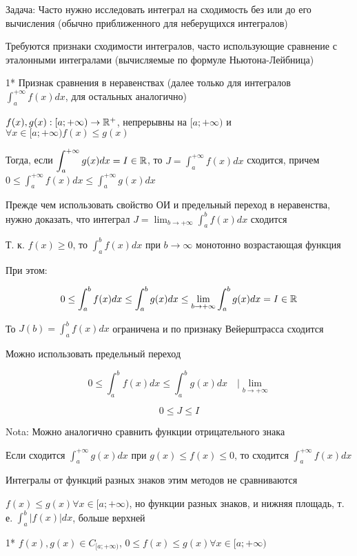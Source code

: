 \documentclass[12pt]{article}
\begin{document}
    Задача: Часто нужно исследовать интеграл на сходимость без или до его вычисления (обычно приближенного для неберущихся интегралов)

    Требуются признаки сходимости интегралов, часто использующие сравнение с эталонными интегралами (вычисляемые по формуле Ньютона-Лейбница)

    1* Признак сравнения в неравенствах (далее только для интегралов $\displaystyle \int^{+\infty}_{a} f(x) dx$, для остальных аналогично)

    $f(x), g(x) : [a;+\infty) \to \mathbb{R}^+$, непрерывны на $[a;+\infty)$ и $\forall x \in [a;+\infty) f(x) \leq g(x)$


    Тогда, если $\displaystyle \int^{+\infty}_{a} g(x) dx = I \in \mathbb{R}$, то $\displaystyle J = \int^{+\infty}_{a} f(x) dx$ сходится,
    причем $\displaystyle0 \leq \int^{+\infty}_{a} f(x) dx \leq \int^{+\infty}_{a} g(x) dx$

    Прежде чем использовать свойство ОИ и предельный переход в неравенства,
    нужно доказать, что интеграл $\displaystyle J = \lim_{b \to +\infty} \int^{b}_{a} f(x) dx$ сходится

    Т. к. $f(x) \geq 0$, то $\displaystyle \int^{b}_{a}f(x)dx$ при $b \to \infty$ монотонно возрастающая функция

    При этом:

    \[0 \leq \int^{b}_{a}f(x)dx \leq \int^{b}_{a}g(x)dx \leq \lim_{b \to +\infty} \int^{b}_{a}g(x)dx = I \in \mathbb{R}\]

    То $\displaystyle J(b) = \int^b_a f(x)dx$ ограничена и по признаку Вейерштрасса сходится

    Можно использовать предельный переход

    \[0 \leq \int^{b}_{a}f(x)dx \leq \int^{b}_{a}g(x)dx \quad \Big| \lim_{b \to +\infty}\]

    \[0 \leq J \leq I\]

    Nota: Можно аналогично сравнить функции отрицательного знака

    Если сходится $\displaystyle \int^{+\infty}_{a} g(x) dx$ при $g(x) \leq f(x) \leq 0$, то сходится $\displaystyle \int^{+\infty}_{a} f(x) dx$

    Интегралы от функций разных знаков этим методов не сравниваются

    $f(x) \leq g(x) \forall x \in [a;+\infty)$, но функции разных знаков, и нижняя площадь, т. е. $\displaystyle \int^{b}_{a} |f(x)| dx$, больше верхней

    1* $f(x), g(x) \in C_{[a;+\infty)}$, $0 \leq f(x) \leq g(x) \forall x \in [a;+\infty)$
\end{document}
